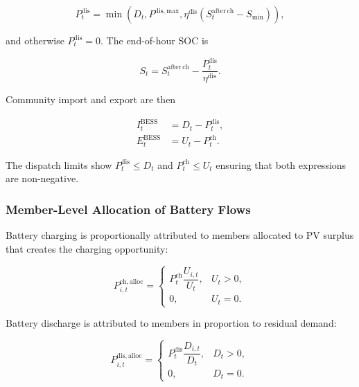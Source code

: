 \begin{equation}
\label{eq:discharging_logic}
P^{\mathrm{dis}}_t=
\min\!\left(D_t,P^{\mathrm{dis,max}},
\eta^{\mathrm{dis}}\left(S^{\mathrm{after\,ch}}_t-S_{\min}\right)\right),
\end{equation}

and otherwise $P^{\mathrm{dis}}_t=0$. The end-of-hour SOC is

\begin{equation}
\label{eq:soc_after_discharge}
S_t=S^{\mathrm{after\,ch}}_t-
\frac{P^{\mathrm{dis}}_t}{\eta^{\mathrm{dis}}}.
\end{equation}

Community import and export are then

\begin{align}
I^{\mathrm{BESS}}_t &= D_t-P^{\mathrm{dis}}_t,\label{eq:bess_import}\\
E^{\mathrm{BESS}}_t &= U_t-P^{\mathrm{ch}}_t.\label{eq:bess_export}
\end{align}

The dispatch limits show $P^{\mathrm{dis}}_t\leq D_t$ and $P^{\mathrm{ch}}_t\leq U_t$ ensuring that both expressions are non-negative.

\subsubsection{Member-Level Allocation of Battery Flows}
\label{subsec:member_level_allocation_bess_flows}

Battery charging is proportionally attributed to members allocated to PV surplus that creates the charging opportunity:

\begin{equation}
\label{eq:allocated_battery_charge}
P^{\mathrm{ch,alloc}}_{i,t}=
\begin{cases}
P^{\mathrm{ch}}_t\dfrac{U_{i,t}}{U_t}, & U_t>0,\\[2mm]
0, & U_t=0.
\end{cases}
\end{equation}

Battery discharge is attributed to members in proportion to residual demand:

\begin{equation}
\label{eq:allocated_battery_discharge_positive}
P^{\mathrm{dis,alloc}}_{i,t}=
\begin{cases}
P^{\mathrm{dis}}_t\dfrac{D_{i,t}}{D_t}, & D_t>0,\\[2mm]
0, & D_t=0.
\end{cases}
\end{equation}

